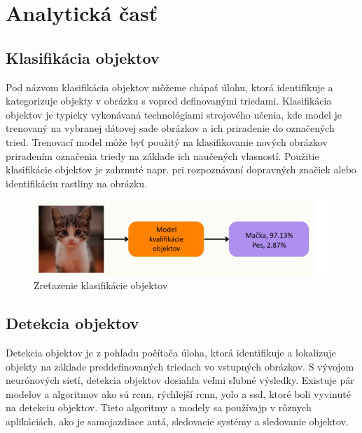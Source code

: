 
\chapter{Analytická časť}\label{ch:current-state}

\section{Klasifikácia objektov}

Pod názvom klasifikácia objektov môžeme chápať úlohu, ktorá identifikuje a kategorizuje objekty v obrázku s vopred definovanými triedami.
Klasifikácia objektov je typicky vykonávaná technológiami strojového učenia, kde model je trenovaný na vybranej dátovej sade obrázkov a ich priradenie do označených tried.
Trenovací model môže byť použitý na klasifikovanie nových obrázkov priradením označenia triedy na základe ich naučených vlasností.
Použitie klasifikácie objektov je zahrnuté napr. pri rozpoznávaní dopravných značiek alebo identifikáciu rastliny na obrázku. \cite{kili}

\begin{figure}[H]
    \centering
    \includegraphics[width=1\linewidth]{figures/OCmodel.png}
    \caption{Zreťazenie klasifikácie objektov \label{OCmodel}}
    \label{fig:enter-label}
\end{figure}

\section{Detekcia objektov}

Detekcia objektov je z pohľadu počítača úloha, ktorá identifikuje a lokalizuje objekty na základe preddefinovaných triedach vo vstupných obrázkov.
S vývojom neurónových sietí, detekcia objektov dosiahla veľmi sľubné výsledky.
Existuje pár modelov a algoritmov ako sú \acrfull{rcnn}, rýchlejší \acrshort{rcnn}, \acrfull{yolo} a \acrfull{ssd}, ktoré boli vyvinuté na detekciu objektov.
Tieto algoritmy a modely sa používajp v rôznych aplikáciách, ako je samojazdiace autá, sledovacie systémy a sledovanie objektov. \cite{kili}

